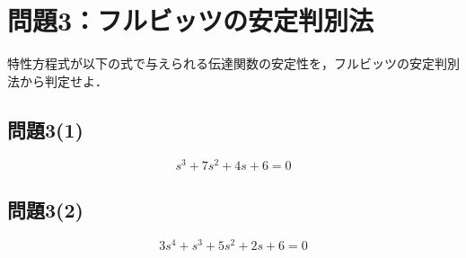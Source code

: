 \documentclass[11pt,a4paper]{ltjsarticle}
\begin{document}
\section{問題3：フルビッツの安定判別法}

特性方程式が以下の式で与えられる伝達関数の安定性を，フルビッツの安定判別法から判定せよ．

\subsection{問題3(1)}
\begin{equation}
s^3 + 7s^2 + 4s + 6 = 0
\end{equation}

\subsection{問題3(2)}
\begin{equation}
3s^4 + s^3 + 5s^2 + 2s + 6 = 0
\end{equation}
\end{document}
